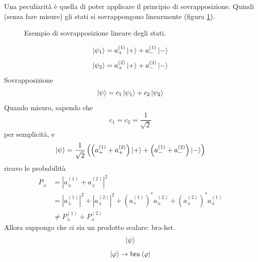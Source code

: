 \bigskip
\noindent
Una peculiarità è quella di poter applicare il principio di sovrapposizione.
Quindi (senza fare misure) gli stati si sovrappongono linearmente (figura
\ref{sovrapposizione_stati}).
\begin{figure}
  \centering
  \caption{Esempio di sovrapposizione lineare degli stati.}
  \label{sovrapposizione_stati}
\end{figure}
\[
  \ket{\psi_1} = a_+^{(1)} \ket{+} + a_-^{(1)} \ket{-}
\]
\[
  \ket{\psi_2} = a_+^{(2)} \ket{+} + a_-^{(2)} \ket{-}
\]
Sovrapposizione
\[
  \ket{\psi} = c_1 \ket{\psi_1} + c_2 \ket{\psi_2}
\]
Quando misuro, sapendo che
\[
  c_1 = c_2 = \frac{1}{\sqrt{2}}
\]
per semplicità, e 
\[
  \ket{\psi} = \frac{1}{\sqrt{2}} \left(
    \left(
      a_+^{(1)} + a_+^{(2)}
    \right) \ket{+} + \left(
      a_-^{(1)} + a_-^{(2)}
    \right) \ket{-}
  \right)
\]
ricavo le probabilità
\begin{align*}
  P_\pm
  &= \left| a_\pm^{(1)} + a_\pm^{(2)} \right|^2 \\
  &= \left| a_\pm^{(1)} \right|^2 + \left| a_\pm^{(2)} \right|^2
    + \left( a_+^{(1)}\right)^* a_\pm^{(2)}
    + \left( a_\pm^{(2)} \right)^* a_\pm^{(1)} \\
  &\neq P_\pm^{(1)} + P_\pm^{(2)}
\end{align*}
Allora suppongo che ci sia un prodotto scalare: bra-ket.
\[
  \ket{\psi}
\]
\[
  \ket{\varphi} \rightarrow \mathrm{bra } \bra{\varphi}
\]
